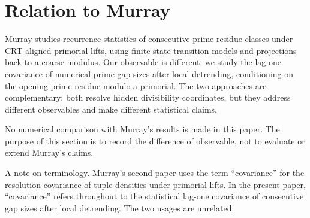 \section{Relation to Murray}

Murray studies recurrence statistics of consecutive-prime residue classes under CRT-aligned primorial lifts, using finite-state transition models and projections back to a coarse modulus. Our observable is different: we study the lag-one covariance of numerical prime-gap sizes after local detrending, conditioning on the opening-prime residue modulo a primorial. The two approaches are complementary: both resolve hidden divisibility coordinates, but they address different observables and make different statistical claims.

No numerical comparison with Murray's results is made in this paper. The purpose of this section is to record the difference of observable, not to evaluate or extend Murray's claims.

A note on terminology. Murray's second paper uses the term ``covariance'' for the resolution covariance of tuple densities under primorial lifts. In the present paper, ``covariance'' refers throughout to the statistical lag-one covariance of consecutive gap sizes after local detrending. The two usages are unrelated.
